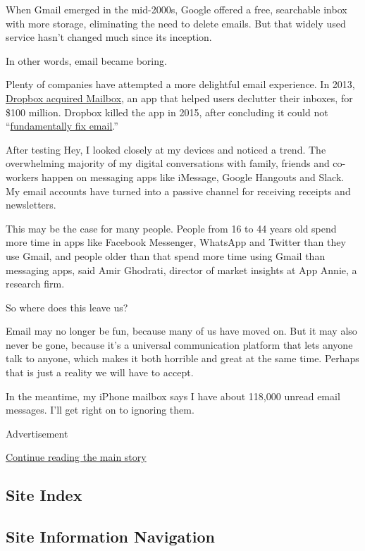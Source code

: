 When Gmail emerged in the mid-2000s, Google offered a free, searchable
inbox with more storage, eliminating the need to delete emails. But that
widely used service hasn't changed much since its inception.

In other words, email became boring.

Plenty of companies have attempted a more delightful email experience.
In 2013,
\href{https://www.theverge.com/2013/3/15/4110532/dropbox-reportedly-paid-around-100-million-for-mailbox}{Dropbox
acquired Mailbox}, an app that helped users declutter their inboxes, for
\$100 million. Dropbox killed the app in 2015, after concluding it could
not
``\href{https://web.archive.org/web/20151229002407/https://www.mailboxapp.com/}{fundamentally
fix email}.''

After testing Hey, I looked closely at my devices and noticed a trend.
The overwhelming majority of my digital conversations with family,
friends and co-workers happen on messaging apps like iMessage, Google
Hangouts and Slack. My email accounts have turned into a passive channel
for receiving receipts and newsletters.

This may be the case for many people. People from 16 to 44 years old
spend more time in apps like Facebook Messenger, WhatsApp and Twitter
than they use Gmail, and people older than that spend more time using
Gmail than messaging apps, said Amir Ghodrati, director of market
insights at App Annie, a research firm.

So where does this leave us?

Email may no longer be fun, because many of us have moved on. But it may
also never be gone, because it's a universal communication platform that
lets anyone talk to anyone, which makes it both horrible and great at
the same time. Perhaps that is just a reality we will have to accept.

In the meantime, my iPhone mailbox says I have about 118,000 unread
email messages. I'll get right on to ignoring them.

Advertisement

\protect\hyperlink{after-bottom}{Continue reading the main story}

\hypertarget{site-index}{%
\subsection{Site Index}\label{site-index}}

\hypertarget{site-information-navigation}{%
\subsection{Site Information
Navigation}\label{site-information-navigation}}

